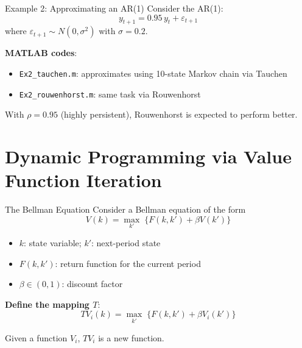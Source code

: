 \documentclass[blue]{beamer}
\begin{document}
\begin{frame}{Example 2: Approximating an AR(1)}
	Consider the AR(1):
	\[
	y_{t+1} = 0.95\, y_t + \varepsilon_{t+1}
	\]
	where $\varepsilon_{t+1} \sim N(0, \sigma^2)$ with $\sigma = 0.2$.
	
	\bigskip
	\textbf{MATLAB codes}:
	\begin{itemize}
		\item \texttt{Ex2\_tauchen.m}: approximates using 10-state Markov chain via Tauchen
		\item \texttt{Ex2\_rouwenhorst.m}: same task via Rouwenhorst
	\end{itemize}
	
	\bigskip
	With $\rho = 0.95$ (highly persistent), Rouwenhorst is expected to perform better.
\end{frame}

\section{Dynamic Programming via Value Function Iteration}

\begin{frame}{The Bellman Equation}
	Consider a Bellman equation of the form
	\[
	V(k) = \max_{k'}\; \{F(k, k') + \beta V(k')\}
	\]
	
	\begin{itemize}
		\item $k$: state variable; $k'$: next-period state
		\item $F(k, k')$: return function for the current period
		\item $\beta \in (0, 1)$: discount factor
	\end{itemize}
	
	\bigskip
	\textbf{Define the mapping $T$}:
	\[
	T V_i(k) = \max_{k'}\; \{F(k, k') + \beta V_i(k')\}
	\]
	
	Given a function $V_i$, $T V_i$ is a new function.
\end{frame}
\end{document}
